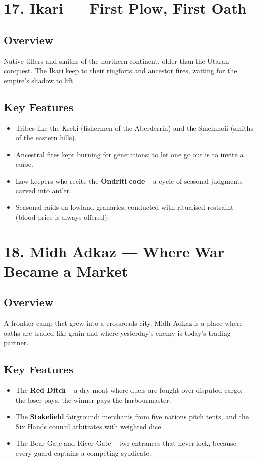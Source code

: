 \documentclass[11pt]{article}
\begin{document}
\section*{17. Ikari --- First Plow, First Oath}

\subsection*{Overview}
Native tillers and smiths of the northern continent, older than the Utaran conquest. The Ikari keep to their ringforts and ancestor fires, waiting for the empire's shadow to lift.

\subsection*{Key Features}
\begin{itemize}[leftmargin=*]
    \item Tribes like the Kreki (fishermen of the Aberderrin) and the Smeinnoii (smiths of the eastern hills).
    \item Ancestral fires kept burning for generations; to let one go out is to invite a curse.
    \item Law-keepers who recite the \textbf{Ondriti code} -- a cycle of seasonal judgments carved into antler.
    \item Seasonal raids on lowland granaries, conducted with ritualised restraint (blood-price is always offered).
\end{itemize}

\section*{18. Midh Adkaz --- Where War Became a Market}

\subsection*{Overview}
A frontier camp that grew into a crossroads city. Midh Adkaz is a place where oaths are traded like grain and where yesterday's enemy is today's trading partner.

\subsection*{Key Features}
\begin{itemize}[leftmargin=*]
    \item The \textbf{Red Ditch} -- a dry moat where duels are fought over disputed cargo; the loser pays, the winner pays the harbourmaster.
    \item The \textbf{Stakefield} fairground: merchants from five nations pitch tents, and the Six Hands council arbitrates with weighted dice.
    \item The Boar Gate and River Gate -- two entrances that never lock, because every guard captains a competing syndicate.
\end{itemize}
\end{document}
